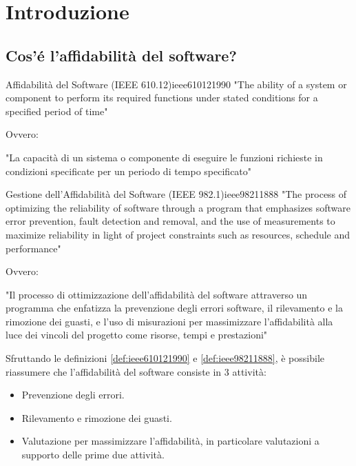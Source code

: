 \section{Introduzione}

\subsection{Cos'é l'affidabilità del software?}

\begin{definizione}{Affidabilità del Software (IEEE 610.12)}{ieee610121990}
"The ability of a system or component to perform its required functions
under stated conditions for a specified period of time"

Ovvero:

"La capacità di un sistema o componente di eseguire le funzioni richieste
in condizioni specificate per un periodo di tempo specificato"
\end{definizione}

\begin{definizione}{Gestione dell'Affidabilità del Software (IEEE 982.1)}{ieee98211888}
"The process of optimizing the reliability of software through a program that
emphasizes software error prevention, fault detection and removal, and the
use of measurements to maximize reliability in light of project constraints
such as resources, schedule and performance"

Ovvero:

"Il processo di ottimizzazione dell'affidabilità del software attraverso un
programma che enfatizza la prevenzione degli errori software, il rilevamento
e la rimozione dei guasti, e l'uso di misurazioni per massimizzare l'affidabilità
alla luce dei vincoli del progetto come risorse, tempi e prestazioni"

\end{definizione}

Sfruttando le definizioni \ref{def:ieee610121990} e \ref{def:ieee98211888},
è possibile riassumere che l'affidabilità del software consiste in 3 attività:
\begin{itemize}
    \item Prevenzione degli errori.
    \item Rilevamento e rimozione dei guasti.
    \item Valutazione per massimizzare l'affidabilità, in particolare valutazioni
    a supporto delle prime due attività.
\end{itemize}

